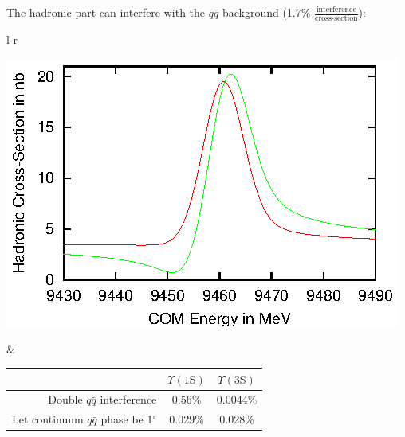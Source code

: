 \begin{slide*}

\slideframe{}
\huge
{}

\begin{minipage}[t]{\linewidth}
\large

The hadronic part can interfere with the $q\bar{q}$ background
(1.7\% $\frac{\mbox{interference}}{\mbox{cross-section}}$):

\begin{center}
  \begin{tabular}{l r}
    \begin{minipage}{0.25\linewidth}
      \includegraphics[width=\linewidth]{bigyint_lineshape.eps}
    \end{minipage} &
    \begin{minipage}{0.6\linewidth}
      \begin{center}
        \begin{tabular}{r | c | c}
          & $\Upsilon(\mbox{1S})$ & $\Upsilon(\mbox{3S})$ \\\hline
          Double $q\bar{q}$ interference & 0.56\% & 0.0044\% \\
          Let continuum $q\bar{q}$ phase be 1$^\circ$ & 0.029\% & 0.028\% \\
        \end{tabular}
      \end{center}
    \end{minipage} \\
  \end{tabular}
\end{center}


\end{minipage}
\end{slide*}
